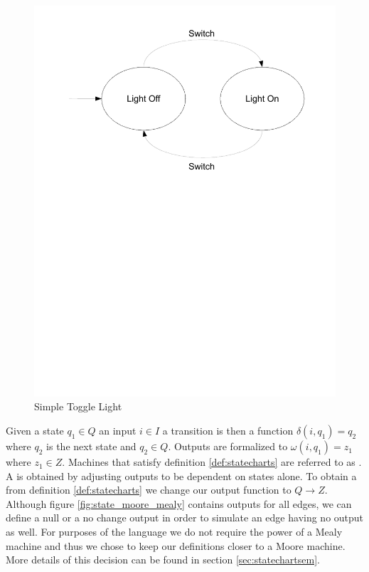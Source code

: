 \begin{figure}[htp]
    \centering
    \includegraphics[trim= 10mm 150mm 10mm 10mm, clip, width=\imgmedium]{./images/state_blink_light.pdf}
    \caption{Simple Toggle Light}
    \label{fig:state_blink_light}
\end{figure}

Given a state $q_1 \in Q$ an input $i \in I$ a transition is then a function $\delta(i,q_1) = q_2$ where $q_2$ is the next state and $q_2 \in Q$.  Outputs are formalized to $\omega(i,q_1)=z_1$ where $z_1 \in Z$. Machines that satisfy definition \ref{def:statecharts} are referred to as  \cite{booth}. A  is obtained by adjusting outputs to be dependent on states alone. To obtain a  from definition \ref{def:statecharts} we change our output function to $Q \rightarrow Z$. Although figure \ref{fig:state_moore_mealy} contains outputs for all edges, we can define a null or a no change output in order to simulate an edge having no output as well. For purposes of the \plccharts language we do not require the power of a Mealy machine and thus we chose to keep our definitions closer to a Moore machine. More details of this decision can be found in section \ref{sec:statechartsem}.

